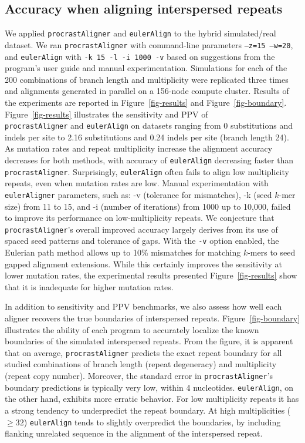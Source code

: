 \documentclass{llncs}
\begin{document}
\subsection{Accuracy when aligning interspersed repeats}
We applied \texttt{procrastAligner} and \texttt{eulerAlign} to the
hybrid simulated/real dataset.  We ran \texttt{procrastAligner}
with command-line parameters \texttt{--z=15 --w=20}, and
\texttt{eulerAlign} with \texttt{-k 15 -l -i 1000 -v} based on suggestions
from the program's user guide and manual experimentation.
Simulations for each of the 200 combinations of branch length and
multiplicity were replicated three times and alignments generated in
parallel on a 156-node compute cluster.  Results of the experiments
are reported in Figure~\ref{fig-results} and
Figure~\ref{fig-boundary}. Figure~\ref{fig-results} illustrates the
sensitivity and PPV of \\
\texttt{procrastAligner} and
\texttt{eulerAlign} on datasets ranging from 0 substitutions and
indels per site to 2.16 substitutions and 0.24 indels per site (branch length 24).  As
mutation rates and repeat multiplicity increase the alignment accuracy
decreases for both methods, with accuracy of \texttt{eulerAlign}
decreasing faster than \texttt{procrastAligner}.  Surprisingly, \texttt{eulerAlign}
often fails to align low multiplicity repeats, even when mutation rates are low.
Manual experimentation with \texttt{eulerAligner} parameters, such as: -v (tolerance for mismatches), -k (seed $k$-mer size) from 11 to 15, and -i (number of iterations) from 1000 up to 10,000, failed to improve its performance on low-multiplicity repeats.
We conjecture that \texttt{procrastAligner}'s overall improved accuracy largely derives
from its use of spaced seed patterns\cite{ref-procrast} and tolerance
of gaps. With the \texttt{-v} option enabled, the Eulerian path method allows up to 10\% mismatches for matching $k$-mers to seed gapped alignment extensions. While this certainly improves the sensitivity at lower mutation rates, the experimental results presented Figure~\ref{fig-results} show that it is inadequate for higher mutation rates.

In addition to sensitivity and PPV benchmarks, we also assess how well
each aligner recovers the true boundaries of interspersed
repeats.  Figure~\ref{fig-boundary} illustrates the ability of each
program to accurately localize the known boundaries of the simulated interspersed
repeats. From the figure, it is apparent that on average, \texttt{procrastAligner} predicts
the exact repeat boundary for all studied combinations of branch length (repeat degeneracy)
and multiplicity (repeat copy number).  Moreover, the standard error in \texttt{procrastAligner}'s
boundary predictions is typically very low, within 4 nucleotides.  \texttt{eulerAlign}, on the other hand,
exhibits more erratic behavior.  For low multiplicity repeats it has a strong tendency to
underpredict the repeat boundary.  At high multiplicities ($\geq32$) \texttt{eulerAlign} tends to
slightly overpredict the boundaries, by including flanking unrelated sequence in the alignment of
the interspersed repeat.
\end{document}
